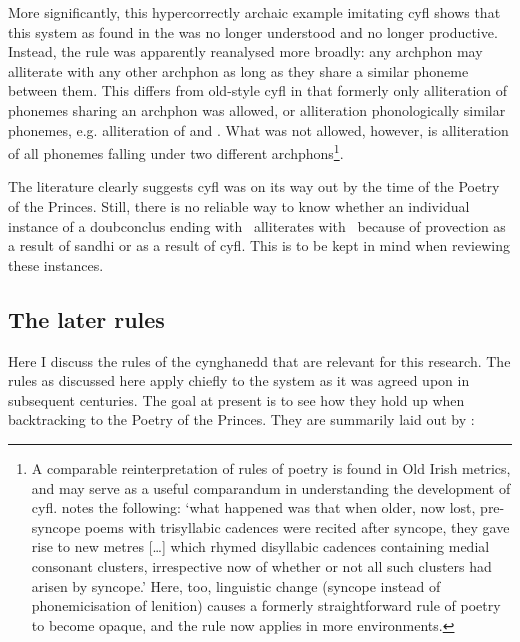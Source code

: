 More significantly, this hypercorrectly archaic example imitating \gls{cyfl} shows that this system as found in the  was no longer understood and no longer productive. Instead, the rule was apparently reanalysed more broadly: any \gls{archphon} may alliterate with any other \gls{archphon} as long as they share a similar phoneme between them. This differs from old-style \gls{cyfl} in that formerly only alliteration of phonemes sharing an \gls{archphon} was allowed, or alliteration phonologically similar phonemes, e.g. alliteration of  and . What was not allowed, however, is alliteration of all phonemes falling under two different \gls{archphon}s\footnote{A comparable reinterpretation of rules of poetry is found in Old Irish metrics, and may serve as a useful comparandum in understanding the development of \gls{cyfl}. \textcite[173]{sims-williams_dating_2016} notes the following: `what happened was that when older, now lost, pre-syncope poems with trisyllabic cadences were recited after syncope, they gave rise to new metres […] which rhymed disyllabic cadences containing medial consonant clusters, irrespective now of whether or not all such clusters had arisen by syncope.' Here, too, linguistic change (syncope instead of phonemicisation of lenition) causes a formerly straightforward rule of poetry to become opaque, and the rule now applies in more environments.
}.

The literature clearly suggests \gls{cyfl} was on its way out by the time of the Poetry of the Princes. Still, there is no reliable way to know whether an individual instance of a \gls{doubconclus} ending with \lT\ alliterates with \xT\ because of provection as a result of sandhi or as a result of \gls{cyfl}. This is to be kept in mind when reviewing these instances.

\subsection{The later rules}
\label{sec:later-rules}
Here I discuss the rules of the cynghanedd that are relevant for this research. The rules as discussed here apply chiefly to the system as it was agreed upon in subsequent centuries. The goal at present is to see how they hold up when backtracking to the Poetry of the Princes.
They are summarily laid out by \textcite{roberts_anghenion_1973}:


